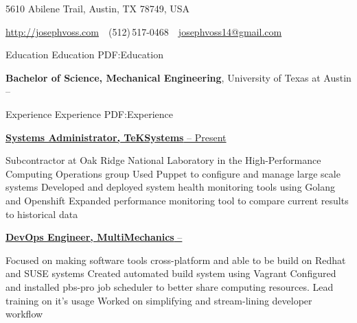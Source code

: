 \documentclass[letterpaper,MMMyyyy,nonstopmode]{simpleresumecv}
\newcommand{\CVAuthor}{Joseph Voss}
\newcommand{\CVWebpage}{http://josephvoss.com}
\begin{document}

\Title{\CVAuthor}

\begin{SubTitle}
{5610 Abilene Trail, Austin, TX 78749, USA}
\par
\href{\CVWebpage}
{\url{\CVWebpage}}
\,\SubBulletSymbol\,
(512)\,517-0468
\,\SubBulletSymbol\,
\href{mailto:josephvoss14@gmail.com}
{josephvoss14@gmail.com}

\end{SubTitle}

\begin{Body}

\BigGap

\Section
{Education}
{Education}
{PDF:Education}

\Entry
{\textbf{Bachelor of Science, Mechanical Engineering}},
University of Texas at Austin
\hfill
{} --


\Section
{Experience}
{Experience}
{PDF:Experience}
\Entry

\href{http://teksystems.com}
{\textbf{Systems Administrator, TeKSystems}
  \hfill {} -- Present}
\Gap
\begin{Detail}
\BulletItem
Subcontractor at Oak Ridge National Laboratory in the High-Performance \newline
  Computing Operations group
\BulletItem
Used Puppet to configure and manage large scale systems
\BulletItem
Developed and deployed system health monitoring tools using Golang and Openshift
\BulletItem
Expanded performance monitoring tool to compare current results to \newline
  historical data

\end{Detail}

\BigGap 
\Entry
\href{http://multimechanics.com}
{\textbf{DevOps Engineer, MultiMechanics}
  \hfill
   --
   }
\Gap
\begin{Detail}
\BulletItem
Focused on making software tools cross-platform and able to be build on \newline
  Redhat and SUSE systems
\BulletItem
Created automated build system using Vagrant
\BulletItem
Configured and installed pbs-pro job scheduler to better share computing
    \newline resources. Lead training on it's usage
\BulletItem
Worked on simplifying and stream-lining developer workflow
\end{Detail}


\end{Body}
\end{document}
